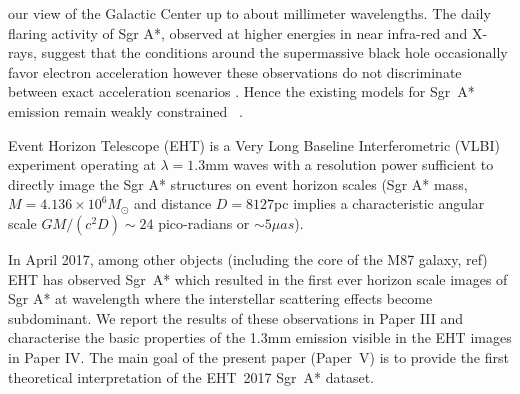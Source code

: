 our view of the Galactic Center up to about millimeter wavelengths. The daily flaring activity of Sgr A*, observed at higher energies in near infra-red and X-rays, suggest that the conditions around the supermassive black hole occasionally favor electron acceleration however these observations do not discriminate between exact acceleration scenarios \citep{2000ApJ...541..234O}. Hence the existing models for Sgr~A* emission remain weakly constrained ~\citep[e.g.,][]{2005ApJ...621..785G,2006MNRAS.370..219M, 2007MNRAS.379.1519M,
  2009A&A...508L..13M, 2009ApJ...698..676D, 2009ApJ...701..521C,
  2009ApJ...706..497M, 2012ApJ...746L..10D, 2012MNRAS.421.1315Z,
  2013A&A...559L...3M, 2014A&A...570A...7M, 2014ApJ...790....1B,
  2015A&A...576A..41B, 2015ApJ...799....1C, 2015ApJ...802...69B,
  2015ApJ...812..103C, 2015Sci...350.1242J, 2016A&A...588A..57F,
  2016ApJ...817..173L, 2016ApJ...824...40O, 2016ApJ...826...77B,
  2016ApJ...831....4P, 2016MNRAS.455.2187M, 2017ApJ...837..180G,
  2017ApJ...844...35M, 2017ApJ...851..148M, 2017MNRAS.467.3604R,
  2018A&A...612A..34D, 2018ApJ...856..163M, 2018ApJ...859...60L,
  2018ApJ...863..148P, 2018ApJ...865..104J, 2018ApJ...868..101B,
  2018JCAP...07..015H, 2018MNRAS.478.1875J, 2018MNRAS.478.5209C,
  2019ApJ...881L...2B, 2019ApJ...884..148B, 2019ApJ...886...96H,
  2020ApJ...896L...6R, 2020ApJ...897...99T, 2020MNRAS.492.3272R,
  2020MNRAS.493.1404A, 2020MNRAS.494.4168D, 2020MNRAS.494.5923P,
  2020arXiv200514251B, 2020MNRAS.497.4999D, 2020arXiv200603658P,
  2020ApJ...896L...6R}.

Event Horizon Telescope (EHT) is a Very Long Baseline Interferometric (VLBI) experiment operating at $\lambda=1.3$mm waves with a resolution power sufficient to directly image the Sgr A* structures on event horizon scales (Sgr A* mass, $M = 4.136 \times 10^6 M_\odot$ and distance $D = 8127$pc implies a characteristic angular scale $GM /(c^2 D) \sim 24$ pico-radians or 
$\sim 5 \mu as$). 

In April 2017, among other objects (including the core of the M87 galaxy, ref) EHT has observed Sgr~A* which resulted in the first ever horizon scale images of Sgr A* at wavelength where the interstellar scattering effects become subdominant. We report the results of these observations in Paper III and characterise the basic properties of the 1.3mm emission visible in the EHT images in Paper IV. The main goal of the present paper (Paper~V) is to provide the first theoretical interpretation of the EHT~2017 Sgr~A* dataset. 


